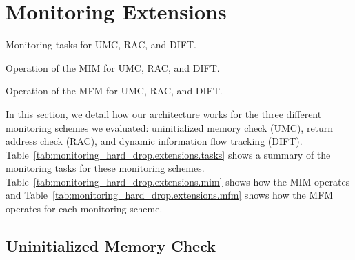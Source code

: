 \section{Monitoring Extensions}
\label{sec:monitoring_hard_drop.extensions}

\begin{table}
  \begin{center}
    \caption{Monitoring tasks for UMC, RAC, and DIFT.}
    \begin{footnotesize}
    
    \end{footnotesize}
    \label{tab:monitoring_hard_drop.extensions.tasks}
  \end{center}
\end{table}

\begin{table}
  \begin{center}
    \caption{Operation of the MIM for UMC, RAC, and DIFT.}
    \begin{footnotesize}
    
    \end{footnotesize}
    \label{tab:monitoring_hard_drop.extensions.mim}
  \end{center}
\end{table}
\begin{table}
  \begin{center}
    \caption{Operation of the MFM for UMC, RAC, and DIFT.}
    \begin{footnotesize}
    
    \end{footnotesize}
    \label{tab:monitoring_hard_drop.extensions.mfm}
  \end{center}
\end{table}

In this section, we detail how our architecture works for the three different
monitoring schemes we evaluated: uninitialized memory check (UMC), return
address check (RAC), and dynamic information flow tracking (DIFT).
Table~\ref{tab:monitoring_hard_drop.extensions.tasks} shows a summary of the
monitoring tasks for these monitoring schemes.
Table~\ref{tab:monitoring_hard_drop.extensions.mim} shows how the MIM operates
and Table~\ref{tab:monitoring_hard_drop.extensions.mfm} shows how the MFM
operates for each monitoring scheme. 

\subsection{Uninitialized Memory Check}
\label{sec:monitoring_hard_drop.extensions.umc}

